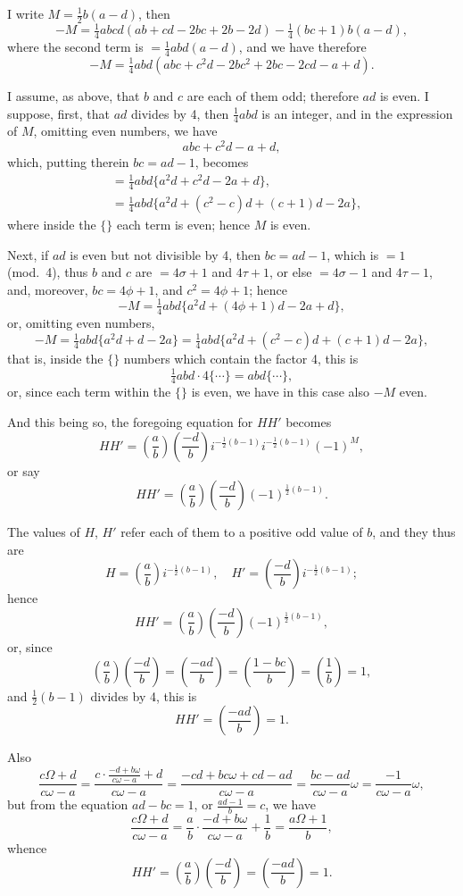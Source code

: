 \documentclass[11pt,a4paper]{article}
\theoremstyle{definition}
\begin{document}
I write $M = \frac{1}{2}b(a - d)$, then
\[
-M = \tfrac{1}{4}abcd(ab + cd - 2bc + 2b - 2d) - \tfrac{1}{4}(bc + 1)b(a - d),
\]
where the second term is $= \frac{1}{4}abd(a - d)$, and we have therefore
\[
-M = \tfrac{1}{4}abd(abc + c^2d - 2bc^2 + 2bc - 2cd - a + d).
\]

I assume, as above, that $b$ and $c$ are each of them odd; therefore $ad$ is even. I suppose, first, that $ad$ divides by 4, then $\frac{1}{4}abd$ is an integer, and in the expression of $M$, omitting even numbers, we have
\[
abc + c^2d - a + d,
\]
which, putting therein $bc = ad - 1$, becomes
\begin{align*}
&= \tfrac{1}{4}abd\{a^2d + c^2d - 2a + d\},\\
&= \tfrac{1}{4}abd\{a^2d + (c^2 - c)d + (c + 1)d - 2a\},
\end{align*}
where inside the $\{\}$ each term is even; hence $M$ is even.

Next, if $ad$ is even but not divisible by 4, then $bc = ad - 1$, which is $= 1$ (mod.~4), thus $b$ and $c$ are $= 4\sigma + 1$ and $4\tau + 1$, or else $= 4\sigma - 1$ and $4\tau - 1$, and, moreover, $bc = 4\phi + 1$, and $c^2 = 4\phi + 1$; hence
\[
-M = \tfrac{1}{4}abd\{a^2d + (4\phi + 1)d - 2a + d\},
\]
or, omitting even numbers,
\[
-M = \tfrac{1}{4}abd\{a^2d + d - 2a\} = \tfrac{1}{4}abd\{a^2d + (c^2 - c)d + (c + 1)d - 2a\},
\]
that is, inside the $\{\}$ numbers which contain the factor 4, this is
\[
\tfrac{1}{4}abd \cdot 4\{\cdots\} = abd\{\cdots\},
\]
or, since each term within the $\{\}$ is even, we have in this case also $-M$ even.

And this being so, the foregoing equation for $HH'$ becomes
\[
HH' = \left(\frac{a}{b}\right)\left(\frac{-d}{b}\right)i^{-\frac{1}{2}(b-1)}i^{-\frac{1}{2}(b-1)}(-1)^M,
\]
or say
\[
HH' = \left(\frac{a}{b}\right)\left(\frac{-d}{b}\right)(-1)^{\frac{1}{2}(b-1)}.
\]

The values of $H$, $H'$ refer each of them to a positive odd value of $b$, and they thus are
\[
H = \left(\frac{a}{b}\right)i^{-\frac{1}{2}(b-1)}, \quad H' = \left(\frac{-d}{b}\right)i^{-\frac{1}{2}(b-1)};
\]
hence
\[
HH' = \left(\frac{a}{b}\right)\left(\frac{-d}{b}\right)(-1)^{\frac{1}{2}(b-1)},
\]
or, since
\[
\left(\frac{a}{b}\right)\left(\frac{-d}{b}\right) = \left(\frac{-ad}{b}\right) = \left(\frac{1 - bc}{b}\right) = \left(\frac{1}{b}\right) = 1,
\]
and $\frac{1}{2}(b-1)$ divides by 4, this is
\[
HH' = \left(\frac{-ad}{b}\right) = 1.
\]

Also
\[
\frac{c\Omega + d}{c\omega - a} = \frac{c\cdot\frac{-d+b\omega}{c\omega-a} + d}{c\omega - a} = \frac{-cd + bc\omega + cd - ad}{c\omega - a} = \frac{bc - ad}{c\omega - a}\omega = \frac{-1}{c\omega - a}\omega,
\]
but from the equation $ad - bc = 1$, or $\frac{ad - 1}{b} = c$, we have
\[
\frac{c\Omega + d}{c\omega - a} = \frac{a}{b}\cdot\frac{-d + b\omega}{c\omega - a} + \frac{1}{b} = \frac{a\Omega + 1}{b},
\]
whence
\[
HH' = \left(\frac{a}{b}\right)\left(\frac{-d}{b}\right) = \left(\frac{-ad}{b}\right) = 1.
\]
\end{document}
